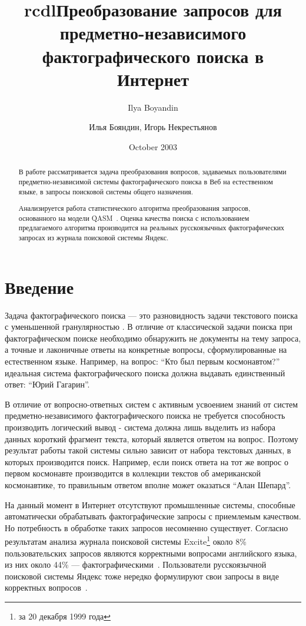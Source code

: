\documentclass{article}
\title{rcdl}
\author{Ilya Boyandin}
\date{October 2003}
\title{Преобразование запросов для предметно-независимого фактографического поиска в Интернет}
\author{Илья Бояндин, Игорь Некрестьянов}
\begin{document}
\maketitle

\begin{abstract}
В работе рассматривается задача преобразования вопросов, задаваемых
пользователями предметно-независимой системы фактографического поиска в Веб 
на естественном языке, в запросы поисковой системы общего 
назначения. 

Анализируется работа статистического алгоритма преобразования запросов,
основанного на модели QASM~\cite{qa:radev:qasm}.
Оценка качества поиска с использованием предлагаемого алгоритма
производится на реальных русскоязычных фактографических запросах из журнала
поисковой системы Яндекс.

\end{abstract}


\section{Введение}

Задача фактографического поиска --- это разновидность задачи текстового
поиска с уменьшенной гранулярностью \cite{irg:websearch}. В отличие от
классической задачи поиска при фактографическом поиске
необходимо обнаружить не документы на тему запроса,
а точные и лаконичные ответы на конкретные вопросы, сформулированные на естественном
языке. Например, на вопрос: ``Кто был первым космонавтом?'' идеальная
система фактографического поиска должна выдавать единственный ответ: ``Юрий
Гагарин''.

В отличие от вопросно-ответных систем с активным усвоением
знаний от систем предметно-независимого фактографического поиска не требуется способность
производить логический вывод -
система должна лишь выделить из набора данных короткий фрагмент текста,
который является ответом на вопрос. 
Поэтому результат работы такой системы сильно зависит от набора текстовых
данных, в которых производится поиск. Например, если 
поиск ответа на тот же вопрос о первом космонавте производится в коллекции 
текстов об американской космонавтике,
то правильным ответом вполне может оказаться ``Алан Шепард''.

На данный момент в Интернет отсутствуют промышленные системы,
способные автоматически обрабатывать фактографические запросы с
приемлемым качеством. Но потребность в обработке таких запросов
несомненно существует. Согласно результатам анализа журнала поисковой
системы Excite\footnote{за 20 декабря 1999 года} около 8\% пользовательских
запросов являются 
корректными вопросами английского языка,
из них около 44\% --- фактографическими~\cite{qa:Tritus}.
Пользователи русскоязычной поисковой системы Яндекс тоже нередко формулируют
свои запросы в виде корректных вопросов~\cite{yandex:voprosy}.
\end{document}
